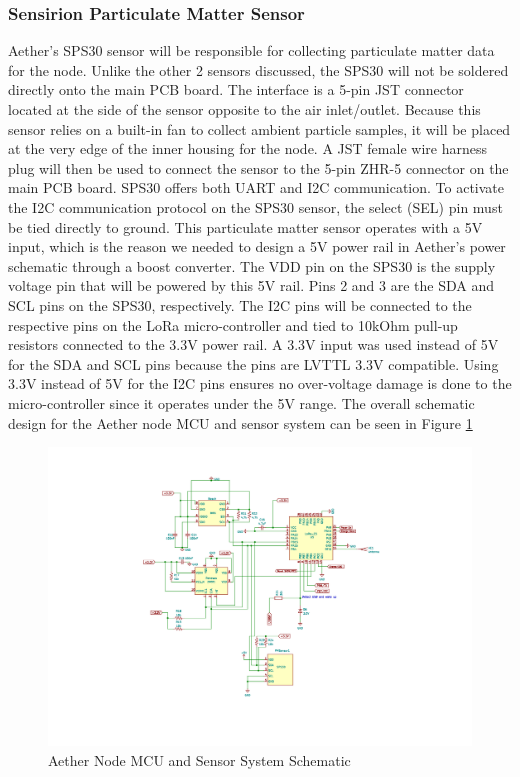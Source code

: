 \subsubsection{Sensirion Particulate Matter Sensor}
Aether's SPS30 sensor will be responsible for collecting particulate matter data for the node. Unlike the other 2 sensors discussed, the SPS30 will not be soldered directly onto the main PCB board. The interface is a 5-pin JST connector located at the side of the sensor opposite to the air inlet/outlet. Because this sensor relies on a built-in fan to collect ambient particle samples, it will be placed at the very edge of the inner housing for the node. A JST female wire harness plug will then be used to connect the sensor to the 5-pin ZHR-5 connector on the main PCB board. SPS30 offers both UART and I2C communication. To activate the I2C communication protocol on the SPS30 sensor, the select (SEL) pin must be tied directly to ground. This particulate matter sensor operates with a 5V input, which is the reason we needed to design a 5V power rail in Aether's power schematic through a boost converter. The VDD pin on the SPS30 is the supply voltage pin that will be powered by this 5V rail. Pins 2 and 3 are the SDA and SCL pins on the SPS30, respectively. The I2C pins will be connected to the respective pins on the LoRa micro-controller and tied to 10kOhm pull-up resistors connected to the 3.3V power rail. A 3.3V input was used instead of 5V for the SDA and SCL pins because the pins are LVTTL 3.3V compatible. Using 3.3V instead of 5V for the I2C pins ensures no over-voltage damage is done to the micro-controller since it operates under the 5V range. The overall schematic design for the Aether node MCU and sensor system can be seen in Figure \ref{fig:MCU_Sensor}

\begin{figure}
    \centering
    \includegraphics[scale=0.5]{figures/MCU_Schematic.jpg}
    \caption{Aether Node MCU and Sensor System Schematic}
    \label{fig:MCU_Sensor} 
\end{figure}


